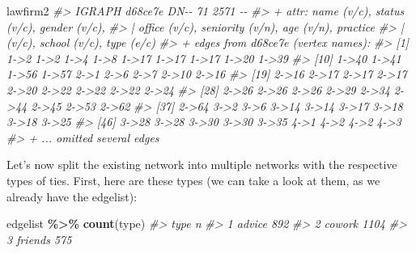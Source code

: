 \documentclass[
]{book}
\newenvironment{Shaded}{\begin{snugshade}}{\end{snugshade}}
\newcommand{\CommentTok}[1]{\textcolor[rgb]{0.56,0.35,0.01}{\textit{#1}}}
\newcommand{\FunctionTok}[1]{\textcolor[rgb]{0.13,0.29,0.53}{\textbf{#1}}}
\newcommand{\NormalTok}[1]{#1}
\newcommand{\SpecialCharTok}[1]{\textcolor[rgb]{0.81,0.36,0.00}{\textbf{#1}}}
\begin{document}
\begin{Shaded}
\begin{Highlighting}[]
\NormalTok{lawfirm2}
\CommentTok{\#\textgreater{} IGRAPH d68ce7e DN{-}{-} 71 2571 {-}{-} }
\CommentTok{\#\textgreater{} + attr: name (v/c), status (v/c), gender (v/c),}
\CommentTok{\#\textgreater{} | office (v/c), seniority (v/n), age (v/n), practice}
\CommentTok{\#\textgreater{} | (v/c), school (v/c), type (e/c)}
\CommentTok{\#\textgreater{} + edges from d68ce7e (vertex names):}
\CommentTok{\#\textgreater{}  [1] 1{-}\textgreater{}2  1{-}\textgreater{}2  1{-}\textgreater{}4  1{-}\textgreater{}8  1{-}\textgreater{}17 1{-}\textgreater{}17 1{-}\textgreater{}17 1{-}\textgreater{}20 1{-}\textgreater{}39}
\CommentTok{\#\textgreater{} [10] 1{-}\textgreater{}40 1{-}\textgreater{}41 1{-}\textgreater{}56 1{-}\textgreater{}57 2{-}\textgreater{}1  2{-}\textgreater{}6  2{-}\textgreater{}7  2{-}\textgreater{}10 2{-}\textgreater{}16}
\CommentTok{\#\textgreater{} [19] 2{-}\textgreater{}16 2{-}\textgreater{}17 2{-}\textgreater{}17 2{-}\textgreater{}17 2{-}\textgreater{}20 2{-}\textgreater{}22 2{-}\textgreater{}22 2{-}\textgreater{}22 2{-}\textgreater{}24}
\CommentTok{\#\textgreater{} [28] 2{-}\textgreater{}26 2{-}\textgreater{}26 2{-}\textgreater{}26 2{-}\textgreater{}29 2{-}\textgreater{}34 2{-}\textgreater{}44 2{-}\textgreater{}45 2{-}\textgreater{}53 2{-}\textgreater{}62}
\CommentTok{\#\textgreater{} [37] 2{-}\textgreater{}64 3{-}\textgreater{}2  3{-}\textgreater{}6  3{-}\textgreater{}14 3{-}\textgreater{}14 3{-}\textgreater{}17 3{-}\textgreater{}18 3{-}\textgreater{}18 3{-}\textgreater{}25}
\CommentTok{\#\textgreater{} [46] 3{-}\textgreater{}28 3{-}\textgreater{}28 3{-}\textgreater{}30 3{-}\textgreater{}30 3{-}\textgreater{}35 4{-}\textgreater{}1  4{-}\textgreater{}2  4{-}\textgreater{}2  4{-}\textgreater{}3 }
\CommentTok{\#\textgreater{} + ... omitted several edges}
\end{Highlighting}
\end{Shaded}

Let's now split the existing network into multiple networks with the respective types of ties. First, here are these types (we can take a look at them, as we already have the edgelist):

\begin{Shaded}
\begin{Highlighting}[]
\NormalTok{edgelist }\SpecialCharTok{\%\textgreater{}\%} 
  \FunctionTok{count}\NormalTok{(type)}
\CommentTok{\#\textgreater{}      type    n}
\CommentTok{\#\textgreater{} 1  advice  892}
\CommentTok{\#\textgreater{} 2  cowork 1104}
\CommentTok{\#\textgreater{} 3 friends  575}
\end{Highlighting}
\end{Shaded}
\end{document}
